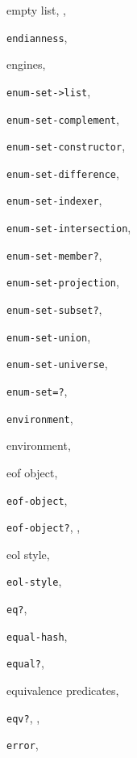 {\begin{multicols}{2}
empty list, \pageref{intro_s32}, \pageref{start_s24}
  
\texttt{endianness}, \textit{\pageref{objects_s240}}
  
engines, \pageref{examples_s82}
  
\texttt{enum-set-\textgreater{}list}, \textit{\pageref{objects_s294}}
  
\texttt{enum-set-complement}, \textit{\pageref{objects_s299}}
  
\texttt{enum-set-constructor}, \textit{\pageref{objects_s292}}
  
\texttt{enum-set-difference}, \textit{\pageref{objects_s298}}
  
\texttt{enum-set-indexer}, \textit{\pageref{objects_s301}}
  
\texttt{enum-set-intersection}, \textit{\pageref{objects_s298}}
  
\texttt{enum-set-member?}, \textit{\pageref{objects_s297}}
  
\texttt{enum-set-projection}, \textit{\pageref{objects_s300}}
  
\texttt{enum-set-subset?}, \textit{\pageref{objects_s295}}
  
\texttt{enum-set-union}, \textit{\pageref{objects_s298}}
  
\texttt{enum-set-universe}, \textit{\pageref{objects_s293}}
  
\texttt{enum-set=?}, \textit{\pageref{objects_s296}}
  
\texttt{environment}, \textit{\pageref{control_s81}}
  
environment, \pageref{examples_s49}
  
eof object, \pageref{io_s4}
  
\texttt{eof-object}, \textit{\pageref{io_s54}}
  
\texttt{eof-object?}, \pageref{io_s5}, \textit{\pageref{io_s53}}
  
eol style, \pageref{io_s14}
  
\texttt{eol-style}, \textit{\pageref{io_s23}}
  
\texttt{eq?}, \textit{\pageref{objects_s10}}
  
\texttt{equal-hash}, \textit{\pageref{objects_s279}}
  
\texttt{equal?}, \textit{\pageref{objects_s13}}
  
equivalence predicates, \pageref{objects_s9}
  
\texttt{eqv?}, \pageref{start_s116}, \textit{\pageref{objects_s12}}
  
\texttt{error}, \textit{\pageref{exceptions_s4}}
  

\end{multicols}}
